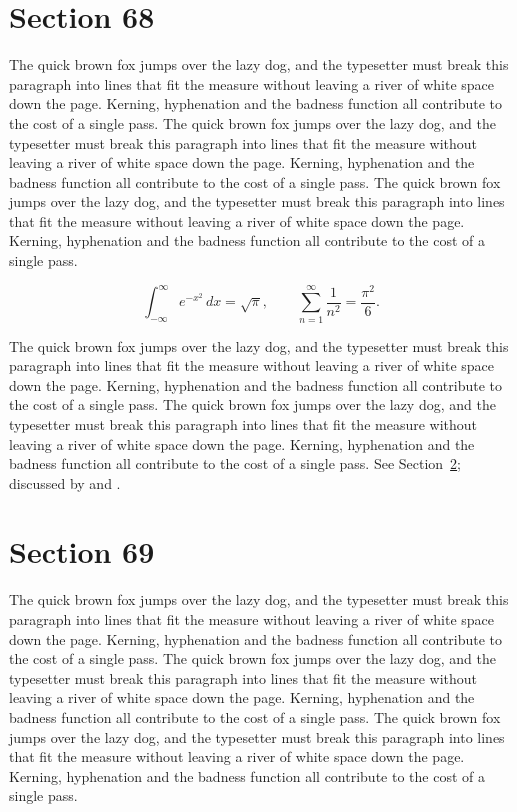 \documentclass{article}
\begin{document}
\section{Section 68}
\label{sec:68}
The quick brown fox jumps over the lazy dog, and the typesetter must break this paragraph into lines that fit the measure without leaving a river of white space down the page. Kerning, hyphenation and the badness function all contribute to the cost of a single pass. The quick brown fox jumps over the lazy dog, and the typesetter must break this paragraph into lines that fit the measure without leaving a river of white space down the page. Kerning, hyphenation and the badness function all contribute to the cost of a single pass. The quick brown fox jumps over the lazy dog, and the typesetter must break this paragraph into lines that fit the measure without leaving a river of white space down the page. Kerning, hyphenation and the badness function all contribute to the cost of a single pass. 

\begin{equation}\label{eq:68}
\int_{-\infty}^{\infty} e^{-x^{2}}\,dx = \sqrt{\pi}, \qquad
\sum_{n=1}^{\infty} \frac{1}{n^{2}} = \frac{\pi^{2}}{6}.
\end{equation}

The quick brown fox jumps over the lazy dog, and the typesetter must break this paragraph into lines that fit the measure without leaving a river of white space down the page. Kerning, hyphenation and the badness function all contribute to the cost of a single pass. The quick brown fox jumps over the lazy dog, and the typesetter must break this paragraph into lines that fit the measure without leaving a river of white space down the page. Kerning, hyphenation and the badness function all contribute to the cost of a single pass. 
See Section~\ref{sec:69}; discussed by \textcite{k4} and \textcite{l1}.
\section{Section 69}
\label{sec:69}
The quick brown fox jumps over the lazy dog, and the typesetter must break this paragraph into lines that fit the measure without leaving a river of white space down the page. Kerning, hyphenation and the badness function all contribute to the cost of a single pass. The quick brown fox jumps over the lazy dog, and the typesetter must break this paragraph into lines that fit the measure without leaving a river of white space down the page. Kerning, hyphenation and the badness function all contribute to the cost of a single pass. The quick brown fox jumps over the lazy dog, and the typesetter must break this paragraph into lines that fit the measure without leaving a river of white space down the page. Kerning, hyphenation and the badness function all contribute to the cost of a single pass. 
\end{document}
